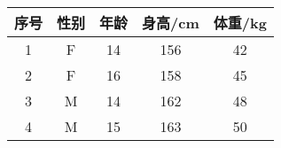 \documentclass [nofonts]{ctexart}
\begin{document}
\begin{tabular}{ccccc}
	\toprule
	序号	& 性别	& 年龄	& 身高/cm	& 体重/kg	\\
	\midrule
	1		& F		& 14	& 156		& 42		\\
	2		& F		& 16	& 158		& 45		\\
	3		& M		& 14	& 162		& 48		\\
	4		& M		& 15	& 163		& 50		\\
	\bottomrule
\end{tabular}
\end{document}
